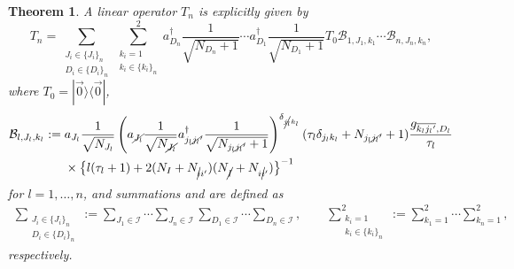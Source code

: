 \documentclass[10pt,a4paper]{amsart}
\numberwithin{equation}{section}
\newtheorem{Theorem}{Theorem}[section]
\begin{document}
\begin{Theorem}\label{thm_left_coeff_opr}
A linear operator $T_{n}$ is explicitly given by
\[%
 T_{n}
 =
 \sum_{
 \substack{
 J_{i}
 \in
 \{J_{i}\}_{n}\\
 D_{i}
 \in
 \{D_{i}\}_{n}
 }
 }
 \sum_{
 \substack{
 k_{i}=1
 \\
 k_{i}
 \in
 \{
 k_{i}
 \}_{n}
 }
 }^{2}
 a_{D_{n}}^{\dagger}
 \frac{1}{
 \sqrt{
 N_{D_{n}}
 +
 1
 }
 }
 \cdots
 a_{D_{1}}^{\dagger}
 \frac{1}{
 \sqrt{
 N_{D_{1}}
 +
 1
 }
 }
 T_{0}
 \mathcal{B}_{
 1,
 J_{1},
 k_{1}
 }
 \cdots
 \mathcal{B}_{
 n,
 J_{n},
 k_{n}
 },
\]
where
$
T_{0}
=
|
\vec{0}
\rangle
\langle
\vec{0}
|
$,
\begin{align*}%
 \mathcal{B}_{
 l,
 J_{l},
 k_{l}
 }
 :={}&
 a_{J_{l}}
 \frac{1}{\sqrt{N_{J_{l}}}}
 \left(
 a_{\cancel{J_{l}}}
 \frac{1}{
 \sqrt{
 N_{\cancel{J_{l}}}
 }
 }
 a_{j_{l}\cancel{j_{l}}'}^{\dagger}
 \frac{1}{
 \sqrt{
 N_{j_{l}\cancel{j_{l}}'}+1
 }
 }
 \right)^{\delta_{\cancel{j_{l}}k_{l}}}
 (
 \tau_{l}
 \delta_{j_{l}k_{l}}
 +
 N_{j_{l}\cancel{j_{l}}'}
 +
 1
 )
 \frac{
 g_{\overline{k_{l}{j_{l}}'},D_{l}}
 }{
 \tau_{l}
 }
 \nonumber
 \\
 &
 \times
 \left\{
 l
 (
 \tau_{l}
 +
 1
 )
 +
 2
 (
 N_{I}
 +
 N_{\cancel{i}i'}
 )
 (
 N_{\cancel{I}}
 +
 N_{i\cancel{i}'}
 )
 \right\}^{-1}
\end{align*}
for $l=1,\dots,n$, and summations
and
are defined as
\begin{align*}
 \sum_{
 \substack{
 J_{i}
 \in
 \{J_{i}\}_{n}\\
 D_{i}
 \in
 \{D_{i}\}_{n}
 }
 }
 :=
 \sum_{
 J_{1}
 \in
 \mathcal{I}
 }
 \cdots
 \sum_{
 J_{n}
 \in
 \mathcal{I}
 }
 \sum_{
 D_{1}
 \in
 \mathcal{I}
 }
 \cdots
 \sum_{
 D_{n}
 \in
 \mathcal{I}
 },
 \qquad
 \sum_{
 \substack{
 k_{i}=1
 \\
 k_{i}
 \in
 \{
 k_{i}
 \}_{n}
 }
 }^{2}
 :=
 \sum_{
 k_{1}
 =1
 }^{2}
 \cdots
 \sum_{
 k_{n}
 =
 1
 }^{2},
\end{align*}
respectively.
\end{Theorem}
\end{document}
